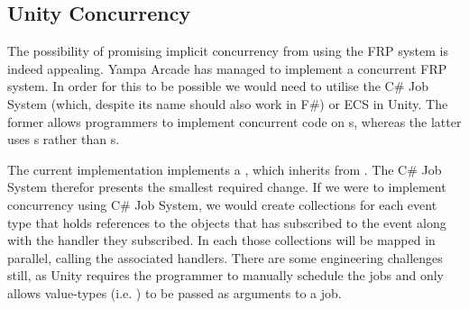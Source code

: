 \subsection{Unity Concurrency}
The possibility of promising implicit concurrency from using the \gls{FRP} system is indeed appealing. Yampa Arcade has managed to implement a concurrent \gls{FRP} system\cite{courtney2003yampa}. In order for this to be possible we would need to utilise the C\# Job System (which, despite its name should also work in F\#) or \gls{ECS} in Unity. The former allows programmers to implement concurrent code on s, whereas the latter uses s rather than s. 

The current implementation implements a , which inherits from . The C\# Job System therefor presents the smallest required change. If we were to implement concurrency using C\# Job System, we would create collections for each event type that holds references to the objects that has subscribed to the event along with the handler they subscribed. In each  those collections will be mapped in parallel, calling the associated handlers. There are some engineering challenges still, as Unity requires the programmer to manually schedule the jobs and only allows value-types (i.e. ) to be passed as arguments to a job.

